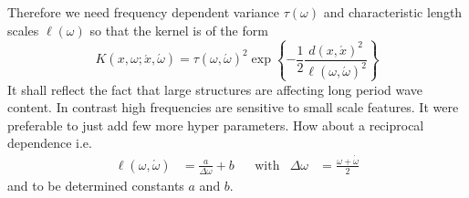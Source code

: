 \documentclass[11pt]{article}
\begin{document}
Therefore we need frequency dependent variance $\tau(\omega)$ and characteristic length scales $\ell(\omega)$ so that the kernel is of the form
\begin{equation}
    K(x,\omega;\acute x,\acute \omega) =
    \tau(\omega,\acute\omega)^2
    \exp\left\{-\frac12 \frac{d(x,\acute x)^2}{\ell(\omega,\acute\omega)^2}\right\}
\end{equation}
It shall reflect the fact that large structures are affecting long period wave content.
In contrast high frequencies are sensitive to small scale features.
It were preferable to just add few more hyper parameters.
How about a reciprocal dependence i.e.
\begin{align}
    \ell(\omega, \acute \omega) &= \frac a{\Delta \omega} + b &
    &\text{with}&
    \Delta \omega &= \frac{\omega + \acute\omega}2
\end{align}
and to be determined constants $a$ and $b$.

\printbibliography
\end{document}
